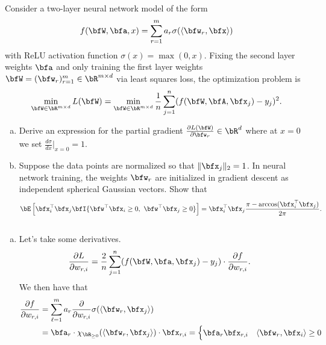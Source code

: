\begin{homework}[e]
  \prob Consider a two-layer neural network model of the form
    \begin{align*}
      f(\bfW, \bfa, x) = \sum_{r=1}^m a_r \sigma(\langle \bfw_r, \bfx \rangle)
    \end{align*}
    with ReLU activation function $\sigma(x) = \max(0,x)$. Fixing the second layer weights $\bfa$ and only training the first layer weights $\bfW = (\bfw_r)^{m}_{r=1} \in \bR^{m\times d}$ via least squares loss, the optimization problem is
    \begin{align*}
      \min_{\bfW\in \bR^{m\times d}} L(\bfW) = \min_{\bfW\in \bR^{m\times d}} \frac{1}{n}\sum_{j=1}^n (f(\bfW, \bfA, \bfx_j) - y_j)^2.
    \end{align*}
    \begin{enumerate}[(a)]
      \item Derive an expression for the partial gradient $\frac{\partial L(\bfW)}{\partial \bfw_r} \in \bR^d$ where at $x = 0$ we set $\frac{d\sigma}{dx}\Big|_{x=0} = 1$.
      \item Suppose the data points are normalized so that $\|\bfx_j\|_2 = 1$. In neural network training, the weights $\bfw_r$ are initialized in gradient descent as independent spherical Gaussian vectors. Show that
        \begin{align*}
          \bE\left[\bfx_i^\top \bfx_j \bfI\{\bfw^\top \bfx_i \geq 0, ~ \bfw^\top\bfx_j \geq 0\}\right] = \bfx_i^\top \bfx_j\frac{\pi - \arccos(\bfx_i^\top\bfx_j)}{2\pi}.
        \end{align*}
    \end{enumerate}
    \begin{prf}$ $
      \begin{enumerate}[(a)]
        \item Let's take some derivatives.
          \begin{align*}
            \frac{\partial L}{\partial w_{r,i}} &= \frac{2}{n}\sum_{j=1}^n (f(\bfW,\bfa,\bfx_j) - y_j) \cdot \frac{\partial f}{\partial w_{r,i}}.
          \end{align*}
          We then have that
          \begin{align*}
            \frac{\partial f}{\partial w_{r,i}} 
            &= \sum_{\ell=1}^m a_r \frac{\partial}{\partial w_{r,i}} \sigma(\langle \bfw_r,\bfx_{j} \rangle) \\
            &= \bfa_r\cdot \chi_{\bR_{\geq 0}}(\langle \bfw_r, \bfx_{j} \rangle) \cdot \bfx_{r,i} =
            \begin{cases}
              \bfa_r \bfx_{r,i} & \langle \bfw_r, \bfx_i \rangle \geq 0 \\

\end{cases}
\end{align*}
\end{enumerate}
\end{prf}
\end{homework}
